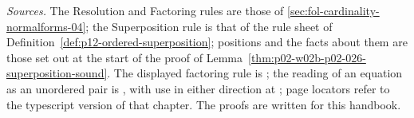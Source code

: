 \emph{Sources.}  The Resolution and Factoring rules are those of
\cref{sec:fol-cardinality-normalforms-04}; the Superposition rule is that of
the rule sheet of Definition~\ref{def:p12-ordered-superposition}; positions
and the facts about them are those set out at the start of the proof of
Lemma~\ref{thm:p02-w02b-p02-026-superposition-sound}.  The displayed
factoring rule is \cite[\S1.1, p.~3]{NieuwenhuisRubio2001Typescript}; the
reading of an equation as an unordered pair is
\cite[\S2.1, p.~12]{NieuwenhuisRubio2001Typescript}, with use in either
direction at \cite[\S1.2, p.~5]{NieuwenhuisRubio2001Typescript}; page
locators refer to the typescript version of that chapter.  The proofs are
written for this handbook.
